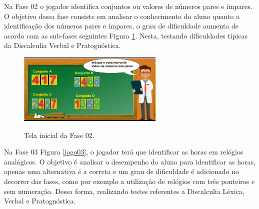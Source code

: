 \documentclass[
	12pt,				%
    oneside,			%
	a4paper,			%
	english,			%
	french,				%
	spanish,			%
	brazil,				%
	]{abntex2}
\begin{document}
Na Fase 02 o jogador identifica conjuntos ou valores de números pares e ímpares. O objetivo dessa fase consiste em analisar o conhecimento do aluno quanto a identificação dos números pares e ímpares, o grau de dificuldade aumenta de acordo com as sub-fases seguintes Figura \ref{jogo02}. Nesta, testando dificuldades típicas da Discalculia Verbal e Pratognóstica.

\begin{figure} [h] 


\caption{Tela inicial da Fase 02.}

\includegraphics[width=0.62\textwidth]{jogo02.png} %
\centering
\\
\label{jogo02} 
\end{figure}

Na Fase 03 Figura \ref{jogo03}, o jogador terá que identificar as horas em relógios analógicos. O objetivo é analisar o desempenho do aluno para identificar as horas, apenas uma alternativa é a correta e um grau de dificuldade é adicionado no decorrer das fases, como por exemplo a utilização de relógios com três ponteiros e sem numeração. Dessa forma, realizando testes referentes a Discalculia Léxica, Verbal e Pratognóstica.
\end{document}
